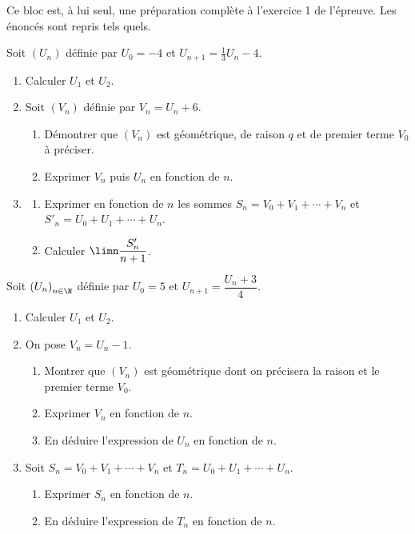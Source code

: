 \begin{annales}
Ce bloc est, à lui seul, une préparation complète à l'exercice 1 de
l'épreuve. Les énoncés sont repris tels quels.

Soit $\left(U_{n}\right)$ définie par $U_{0} = -4$ et
$U_{n+1} = \frac13U_{n}-4$.
\begin{enumerate}[label=\textbf{\arabic*)}, leftmargin=*, itemsep=0.15em]
  \item Calculer $U_{1}$ et $U_{2}$.
  \item Soit $\left(V_{n}\right)$ définie par $V_{n} = U_{n}+6$.
        \begin{enumerate}[label=\textbf{\alph*)}, leftmargin=1.4em]
          \item Démontrer que $\left(V_{n}\right)$ est géométrique, de
                raison $q$ et de premier terme $V_{0}$ à préciser.
          \item Exprimer $V_{n}$ puis $U_{n}$ en fonction de $n$.
        \end{enumerate}
  \item \begin{enumerate}[label=\textbf{\alph*)}, leftmargin=1.4em]
          \item Exprimer en fonction de $n$ les sommes
                $S_{n} = V_{0}+V_{1}+\cdots+V_{n}$ et
                $S'_{n} = U_{0}+U_{1}+\cdots+U_{n}$.
          \item Calculer $\displaystyle\limn \frac{S'_{n}}{n+1}$.
        \end{enumerate}
\end{enumerate}

Soit $\left(U_{n}\right)_{n \in \N}$ définie par $U_{0} = 5$ et
$U_{n+1} = \dfrac{U_{n}+3}{4}$.
\begin{enumerate}[label=\textbf{\arabic*)}, leftmargin=*, itemsep=0.15em]
  \item Calculer $U_{1}$ et $U_{2}$.
  \item On pose $V_{n} = U_{n}-1$.
        \begin{enumerate}[label=\textbf{\alph*)}, leftmargin=1.4em]
          \item Montrer que $\left(V_{n}\right)$ est géométrique dont on
                précisera la raison et le premier terme $V_{0}$.
          \item Exprimer $V_{n}$ en fonction de $n$.
          \item En déduire l'expression de $U_{n}$ en fonction de $n$.
        \end{enumerate}
  \item Soit $S_{n} = V_{0}+V_{1}+\cdots+V_{n}$ et
        $T_{n} = U_{0}+U_{1}+\cdots+U_{n}$.
        \begin{enumerate}[label=\textbf{\alph*)}, leftmargin=1.4em]
          \item Exprimer $S_{n}$ en fonction de $n$.
          \item En déduire l'expression de $T_{n}$ en fonction de $n$.
        \end{enumerate}
\end{enumerate}


\end{annales}

